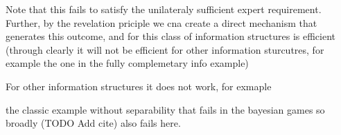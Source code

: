 Note that this fails to satisfy the unilateraly sufficient expert requirement. Further, by the revelation priciple we cna create a direct mechanism that generates this outcome, and for this class of information structures is efficient (through clearly it will not be efficient for other information sturcutres, for example the one in the fully complemetary info example)

For other information structures it does not work, for exmaple 
\begin{eg}
	the classic example without separability that fails in the bayesian games so broadly (TODO Add cite) also fails here. 
\end{eg}












